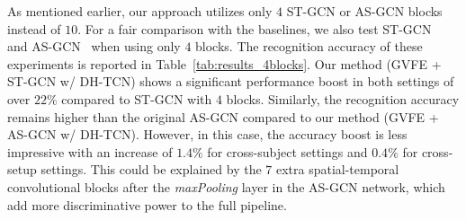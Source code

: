 \documentclass{article}
\begin{document}
As mentioned earlier, our approach utilizes only $4$ ST-GCN or AS-GCN blocks instead of $10$. For a fair comparison with the baselines, we also test ST-GCN~\cite{yan2018spatial} and AS-GCN~\cite{li2019actional} when using only $4$ blocks. The recognition accuracy of these experiments is reported in Table~\ref{tab:results_4blocks}.
Our method (GVFE + ST-GCN w/ DH-TCN) shows a significant performance boost in both settings of over $22\%$ compared to ST-GCN with $4$ blocks. Similarly, the recognition accuracy remains higher than the original AS-GCN compared to our method (GVFE + AS-GCN w/ DH-TCN). However, in this case, the accuracy boost is less impressive with an increase of $1.4\%$ for cross-subject settings and $0.4\%$ for cross-setup settings. This could be explained by the $7$ extra spatial-temporal convolutional blocks after the {\em maxPooling} layer in the AS-GCN network, which add more discriminative power to the full pipeline.










\begin{table}[ht!]
        \centering
        \caption{Accuracy of recognition (\%) using only $4$ ST-GCN or AS-GCN blocks on NTU-120 dataset for cross-subject and cross-setup settings. *These values are not reported in the state-of-the-art. Thus, the available codes have been used to obtain these results.}
        \label{tab:results_4blocks}
    \end{table}
    
\end{document}
